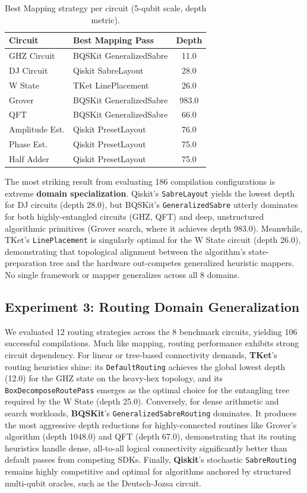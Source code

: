 \documentclass[conference]{IEEEtran}
\begin{document}
\begin{table}[ht]
\centering
\caption{Best Mapping strategy per circuit (5-qubit scale, depth metric).}
\label{tab:mapping}
\begin{tabular}{llc}
\hline
\textbf{Circuit} & \textbf{Best Mapping Pass} & \textbf{Depth} \\
\hline
GHZ Circuit  & BQSKit GeneralizedSabre & 11.0 \\
DJ Circuit   & Qiskit SabreLayout      & 28.0 \\
W State      & TKet LinePlacement      & 26.0 \\
Grover       & BQSKit GeneralizedSabre & 983.0 \\
QFT          & BQSKit GeneralizedSabre & 66.0 \\
Amplitude Est. & Qiskit PresetLayout   & 76.0 \\
Phase Est.   & Qiskit PresetLayout     & 75.0 \\
Half Adder   & Qiskit PresetLayout     & 75.0 \\
\hline
\end{tabular}
\end{table}

The most striking result from evaluating 186 compilation configurations is extreme \textbf{domain specialization}. Qiskit's \texttt{SabreLayout} yields the lowest depth for DJ circuits (depth 28.0), but BQSKit's \texttt{GeneralizedSabre} utterly dominates for both highly-entangled circuits (GHZ, QFT) and deep, unstructured algorithmic primitives (Grover search, where it achieves depth 983.0). Meanwhile, TKet's \texttt{LinePlacement} is singularly optimal for the W State circuit (depth 26.0), demonstrating that topological alignment between the algorithm's state-preparation tree and the hardware out-competes generalized heuristic mappers. No single framework or mapper generalizes across all 8 domains.

\subsection{Experiment 3: Routing Domain Generalization}

We evaluated 12 routing strategies across the 8 benchmark circuits, yielding 106 successful compilations. Much like mapping, routing performance exhibits strong circuit dependency. For linear or tree-based connectivity demands, \textbf{TKet}'s routing heuristics shine: its \texttt{DefaultRouting} achieves the global lowest depth (12.0) for the GHZ state on the heavy-hex topology, and its \texttt{BoxDecomposeRoutePass} emerges as the optimal choice for the entangling tree required by the W State (depth 25.0). Conversely, for dense arithmetic and search workloads, \textbf{BQSKit}'s \texttt{GeneralizedSabreRouting} dominates. It produces the most aggressive depth reductions for highly-connected routines like Grover's algorithm (depth 1048.0) and QFT (depth 67.0), demonstrating that its routing heuristics handle dense, all-to-all logical connectivity significantly better than default passes from competing SDKs. Finally, \textbf{Qiskit}'s stochastic \texttt{SabreRouting} remains highly competitive and optimal for algorithms anchored by structured multi-qubit oracles, such as the Deutsch-Jozsa circuit.
\end{document}
